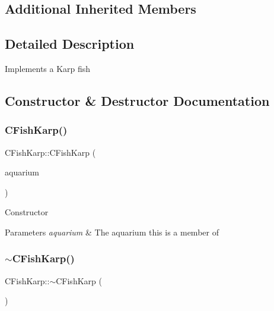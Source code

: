 \subsection*{Additional Inherited Members}


\subsection{Detailed Description}
Implements a Karp fish 

\subsection{Constructor \& Destructor Documentation}
\mbox{\label{class_c_fish_karp_a6852207eec4ed8fa617409cb2dff4681}} 
\subsubsection{\texorpdfstring{C\+Fish\+Karp()}{CFishKarp()}}
{\footnotesize\ttfamily C\+Fish\+Karp\+::\+C\+Fish\+Karp (\begin{DoxyParamCaption}\item[{\mbox{\hyperlink{class_c_aquarium}{C\+Aquarium}} $\ast$}]{aquarium }\end{DoxyParamCaption})}

Constructor 
\begin{DoxyParams}{Parameters}
{\em aquarium} & The aquarium this is a member of \\
\hline
\end{DoxyParams}
\mbox{\label{class_c_fish_karp_a8e89f8df98a055864179326657919755}} 
\subsubsection{\texorpdfstring{$\sim$\+C\+Fish\+Karp()}{~CFishKarp()}}
{\footnotesize\ttfamily C\+Fish\+Karp\+::$\sim$\+C\+Fish\+Karp (\begin{DoxyParamCaption}{ }\end{DoxyParamCaption})\hspace{0.3cm}{\ttfamily [virtual]}}

